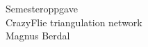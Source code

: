 \documentclass[a4paper]{article}
\begin{document}
\begin{titlepage}
\begin{center}
\Large Semesteroppgave \\
\vspace{10pt}
\Large CrazyFlie triangulation network\\
\vspace{10pt}
\large Magnus Berdal
\end{center}
\end{titlepage}
\clearpage
\tableofcontents










\end{document}
